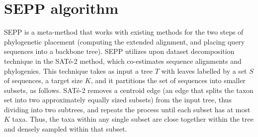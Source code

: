 % 

\section{SEPP algorithm}\label{sepp:algorithm}
SEPP is a meta-method that works with existing
methods for the two steps of phylogenetic placement (computing
the extended alignment, and placing query sequences into
a backbone tree).  SEPP
utilizes upon dataset decomposition technique in
the SAT\'{e}-2 method, which co-estimates sequence alignments and
phylogenies.  This technique takes as input a tree $T$
with leaves labelled by a set $S$ of sequences, a target size $K$,
and it
partitions the set of sequences into smaller subsets, as follows.
SAT\'{e}-2 removes a centroid edge (an edge that
splits the taxon set into two approximately equally sized subsets)
from the input 
tree, thus dividing into two subtrees,
and repeats the process
 until each subset has at most $K$ taxa.
Thus,  the taxa within
any single subset are close together
within the tree and densely sampled within that subset.

